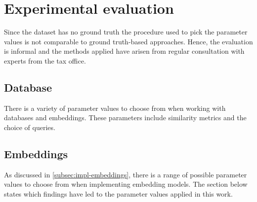 \chapter{Experimental evaluation}\label{ch:evaluation}

Since the dataset has no ground truth the procedure used to pick the parameter values is not comparable to ground truth-based approaches.
Hence, the evaluation is informal and the methods applied have arisen from regular consultation with experts from the tax office.

 \section{Database}\label{sec:eval-db}
There is a variety of parameter values to choose from when working with databases and embeddings.
These parameters include similarity metrics and the choice of queries.

 

 

 
 
\section{Embeddings}\label{sec:eval-embeddings}
As discussed in \autoref{subsec:impl-embeddings}, there is a range of possible parameter values to choose from when implementing embedding models.
The section below states which findings have led to the parameter values applied in this work.















